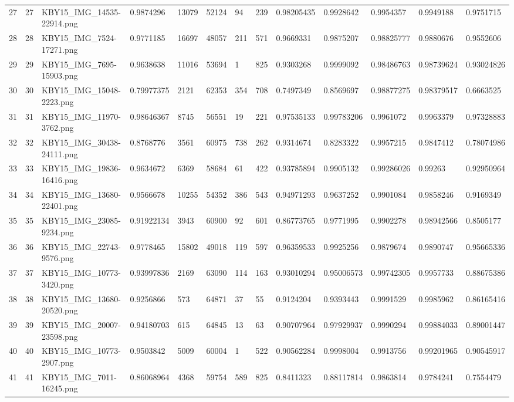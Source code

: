\documentclass[11pt, a4paper, twoside]{report}
\begin{document}
\begin{longtable}[c]{@{}lllllllllllll@{}}
27 & 27 & KBY15\_IMG\_14535-22914.png & 0.9874296 & 13079 & 52124 & 94 & 239 & 0.98205435 & 0.9928642 & 0.9954357 & 0.9949188 & 0.9751715 \\
28 & 28 & KBY15\_IMG\_7524-17271.png & 0.9771185 & 16697 & 48057 & 211 & 571 & 0.9669331 & 0.9875207 & 0.98825777 & 0.9880676 & 0.9552606 \\
29 & 29 & KBY15\_IMG\_7695-15903.png & 0.9638638 & 11016 & 53694 & 1 & 825 & 0.9303268 & 0.9999092 & 0.98486763 & 0.98739624 & 0.93024826 \\
30 & 30 & KBY15\_IMG\_15048-2223.png & 0.79977375 & 2121 & 62353 & 354 & 708 & 0.7497349 & 0.8569697 & 0.98877275 & 0.98379517 & 0.6663525 \\
31 & 31 & KBY15\_IMG\_11970-3762.png & 0.98646367 & 8745 & 56551 & 19 & 221 & 0.97535133 & 0.99783206 & 0.9961072 & 0.9963379 & 0.97328883 \\
32 & 32 & KBY15\_IMG\_30438-24111.png & 0.8768776 & 3561 & 60975 & 738 & 262 & 0.9314674 & 0.8283322 & 0.9957215 & 0.9847412 & 0.78074986 \\
33 & 33 & KBY15\_IMG\_19836-16416.png & 0.9634672 & 6369 & 58684 & 61 & 422 & 0.93785894 & 0.9905132 & 0.99286026 & 0.99263 & 0.92950964 \\
34 & 34 & KBY15\_IMG\_13680-22401.png & 0.9566678 & 10255 & 54352 & 386 & 543 & 0.94971293 & 0.9637252 & 0.9901084 & 0.9858246 & 0.9169349 \\
35 & 35 & KBY15\_IMG\_23085-9234.png & 0.91922134 & 3943 & 60900 & 92 & 601 & 0.86773765 & 0.9771995 & 0.9902278 & 0.98942566 & 0.8505177 \\
36 & 36 & KBY15\_IMG\_22743-9576.png & 0.9778465 & 15802 & 49018 & 119 & 597 & 0.96359533 & 0.9925256 & 0.9879674 & 0.9890747 & 0.95665336 \\
37 & 37 & KBY15\_IMG\_10773-3420.png & 0.93997836 & 2169 & 63090 & 114 & 163 & 0.93010294 & 0.95006573 & 0.99742305 & 0.9957733 & 0.88675386 \\
38 & 38 & KBY15\_IMG\_13680-20520.png & 0.9256866 & 573 & 64871 & 37 & 55 & 0.9124204 & 0.9393443 & 0.9991529 & 0.9985962 & 0.86165416 \\
39 & 39 & KBY15\_IMG\_20007-23598.png & 0.94180703 & 615 & 64845 & 13 & 63 & 0.90707964 & 0.97929937 & 0.9990294 & 0.99884033 & 0.89001447 \\
40 & 40 & KBY15\_IMG\_10773-2907.png & 0.9503842 & 5009 & 60004 & 1 & 522 & 0.90562284 & 0.9998004 & 0.9913756 & 0.99201965 & 0.90545917 \\
41 & 41 & KBY15\_IMG\_7011-16245.png & 0.86068964 & 4368 & 59754 & 589 & 825 & 0.8411323 & 0.88117814 & 0.9863814 & 0.9784241 & 0.7554479 \\

\end{longtable}
\end{document}
